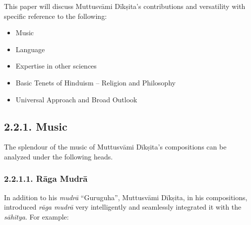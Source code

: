 This paper will discuss Muttusvāmi Dīkṣita’s contributions and versatility with specific reference to the following:

\begin{itemize}
\item Music

 \item Language

 \item Expertise in other sciences

 \item Basic Tenets of Hinduism – Religion and Philosophy

 \item Universal Approach and Broad Outlook

\end{itemize}


\subsection*{2.2.1. Music}

The splendour of the music of Muttusvāmi Dīkṣita’s compositions can be analyzed under the following heads.

\subsubsection*{2.2.1.1. Rāga Mudrā}

In addition to his \textit{mudrā} “Guruguha”, Muttusvāmi Dīkṣita, in his compositions, introduced \textit{rāga mudrā} very intelligently and seamlessly integrated it with the \textit{sāhitya}. For example:

